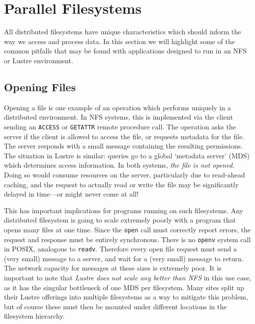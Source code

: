 \section{Parallel Filesystems}\label{sec:parallel_fs}

All distributed filesystems have unique characteristics which should
inform the way we access and process data.  In this section we
will highlight some of the common pitfalls that may be found with
applications designed to run in an NFS or Lustre environment.

\subsection{Opening Files}

Opening a file is one example of an operation which performs uniquely
in a distributed environment.  In NFS systems, this is implemented
via the client sending an \verb!ACCESS! or \verb!GETATTR! remote
procedure call.  The operation asks the server if the client is allowed
to access the file, or requests metadata for the file.  The server
responds with a small message containing the resulting permissions.
The situation in Lustre is similar: queries go to a global `metadata
server' (MDS) which determines access information.  In both systems,
\emph{the file is not opened}.  Doing so would consume resources on
the server, particularly due to read-ahead caching, and the request
to actually read or write the file may be significantly delayed in
time---or might never come at all!

%

This has important implications for programs running on such
filesystems.  Any distributed filesystem is going to scale extremely
poorly with a program that opens many files at one time.  Since the
\verb!open! call must correctly report errors, the request and response
must be entirely synchronous.  There is no \verb!openv! system call in
POSIX, analogous to \verb!readv!.  Therefore every open file request
must send a (very small) message to a server, and wait for a (very
small) message to return.  The network capacity for messages at these
sizes is extremely poor.  It is important to note that \emph{Lustre
does not scale any better than NFS} in this use case, as it has the
singular bottleneck of one MDS per filesystem.  Many sites split up
their Lustre offerings into multiple filesystems as a way to mitigate
this problem, but of course these must then be mounted under different
locations in the filesystem hierarchy.

